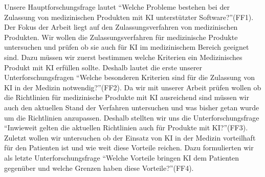 Unsere Hauptforschungsfrage lautet "`Welche Probleme bestehen bei der Zulassung von medizinischen Produkten mit KI unterstützter Software?"'(FF1).
Der Fokus der Arbeit liegt auf den Zulassungsverfahren von medizinischen Produkten. Wir wollen die Zulassungsverfahren für medizinische Produkte untersuchen und prüfen ob sie auch für KI im medizinischem Bereich geeignet sind. Dazu müssen wir zuerst bestimmen welche Kriterien ein Medizinisches Produkt mit KI erfüllen sollte. Deshalb lautet die erste unserer Unterforschungsfragen "`Welche besonderen Kriterien sind für die Zulassung von KI in der Medizin notwendig?"'(FF2). 
Da wir mit unserer Arbeit prüfen wollen ob die Richtlinien für medizinische Produkte mit KI ausreichend sind müssen wir auch den aktuellen Stand der Verfahren untersuchen und was bisher getan wurde um die Richtlinien anzupassen. Deshalb stellten wir uns die Unterforschungsfrage "`Inwieweit gelten die aktuellen Richtlinien auch für Produkte mit KI?"'(FF3). Zuletzt wollen wir untersuchen ob der Einsatz von KI in der Medizin vorteilhaft für den Patienten ist und wie weit diese Vorteile reichen. Dazu formulierten wir als letzte Unterforschungsfrage "`Welche Vorteile bringen KI dem Patienten gegenüber und welche Grenzen haben diese Vorteile?"'(FF4).